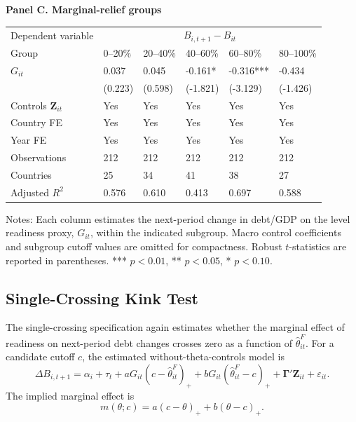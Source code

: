 \begin{table}[H]
\begin{threeparttable}
\vspace{0.75em}
\textbf{Panel C. Marginal-relief groups}\\[0.45em]
\begin{tabularx}{\textwidth}{lYYYYY}
\toprule
Dependent variable &  \\
\cmidrule(lr){2-6}
Group & 0--20\% & 20--40\% & 40--60\% & 60--80\% & 80--100\% \\
\midrule
$G_{it}$ & 0.037 & 0.045 & -0.161* & -0.316*** & -0.434 \\
 & (0.223) & (0.598) & (-1.821) & (-3.129) & (-1.426) \\
\midrule
Controls $\mathbf{Z}_{it}$ & Yes & Yes & Yes & Yes & Yes \\
Country FE & Yes & Yes & Yes & Yes & Yes \\
Year FE & Yes & Yes & Yes & Yes & Yes \\
Observations & 212 & 212 & 212 & 212 & 212 \\
Countries & 25 & 34 & 41 & 38 & 27 \\
Adjusted $R^2$ & 0.576 & 0.610 & 0.413 & 0.697 & 0.588 \\
\bottomrule
\end{tabularx}
\begin{tablenotes}[flushleft]\footnotesize
\item Notes: Each column estimates the next-period change in debt/GDP on the level readiness proxy, $G_{it}$, within the indicated subgroup. Macro control coefficients and subgroup cutoff values are omitted for compactness. Robust $t$-statistics are reported in parentheses. *** $p<0.01$, ** $p<0.05$, * $p<0.10$.
\end{tablenotes}
\end{threeparttable}
\end{table}

\subsection{Single-Crossing Kink Test}

The single-crossing specification again estimates whether the marginal effect of readiness on next-period debt changes crosses zero as a function of $\widehat\theta^F_{it}$. For a candidate cutoff $c$, the estimated without-theta-controls model is
\begin{equation}
\Delta B_{i,t+1}
=
\alpha_i+\tau_t
+aG_{it}(c-\widehat\theta^F_{it})_+
+bG_{it}(\widehat\theta^F_{it}-c)_+
+\boldsymbol{\Gamma}'\mathbf{Z}_{it}
+\varepsilon_{it}.
\label{eq:appc_kink}
\end{equation}
The implied marginal effect is
\begin{equation}
m(\theta;c)
=
a(c-\theta)_+
+
b(\theta-c)_+.
\label{eq:appc_kink_marginal}
\end{equation}

